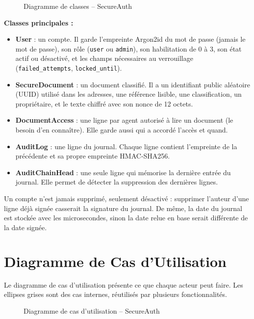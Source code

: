 \documentclass[12pt,a4paper]{report}
\newcommand{\code}[1]{\texttt{\NoAutoSpacing #1}}
\begin{document}
\begin{figure}[H]
\centering
{}
\caption{Diagramme de classes -- SecureAuth}
\end{figure}

\textbf{Classes principales :}
\begin{itemize}
  \item \textbf{User} : un compte. Il garde l'empreinte Argon2id du mot de passe (jamais le mot de passe), son rôle (\code{user} ou \code{admin}), son habilitation de 0 à 3, son état actif ou désactivé, et les champs nécessaires au verrouillage (\code{failed\_attempts}, \code{locked\_until}).
  \item \textbf{SecureDocument} : un document classifié. Il a un identifiant public aléatoire (UUID) utilisé dans les adresses, une référence lisible, une classification, un propriétaire, et le texte chiffré avec son nonce de 12 octets.
  \item \textbf{DocumentAccess} : une ligne par agent autorisé à lire un document (le besoin d'en connaître). Elle garde aussi qui a accordé l'accès et quand.
  \item \textbf{AuditLog} : une ligne du journal. Chaque ligne contient l'empreinte de la précédente et sa propre empreinte HMAC-SHA256.
  \item \textbf{AuditChainHead} : une seule ligne qui mémorise la dernière entrée du journal. Elle permet de détecter la suppression des dernières lignes.
\end{itemize}

Un compte n'est jamais supprimé, seulement désactivé : supprimer l'auteur d'une ligne déjà signée casserait la signature du journal. De même, la date du journal est stockée avec les microsecondes, sinon la date relue en base serait différente de la date signée.

\section{Diagramme de Cas d'Utilisation}

Le diagramme de cas d'utilisation présente ce que chaque acteur peut faire. Les ellipses grises sont des cas internes, réutilisés par plusieurs fonctionnalités.

\begin{figure}[H]
\centering
{}
\caption{Diagramme de cas d'utilisation -- SecureAuth}
\end{figure}
\end{document}
